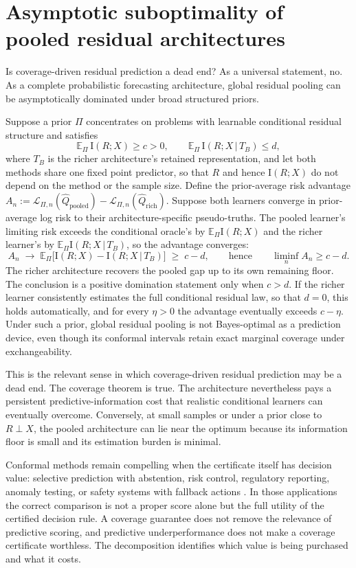 \documentclass[11pt]{article}
\theoremstyle{remark}
\newcommand{\E}{\mathbb{E}}
\newcommand{\I}{\mathrm{I}}
\newcommand{\given}{\,|\,}
\newcommand{\Loss}{\mathcal{L}}
\begin{document}
\section{Asymptotic suboptimality of pooled residual architectures}\label{sec:deadend}

Is coverage-driven residual prediction a dead end? As a universal statement, no. As a complete
probabilistic forecasting architecture, global residual pooling can be asymptotically dominated
under broad structured priors.

Suppose a prior $\Pi$ concentrates on problems with learnable conditional residual structure
and satisfies
\[
\E_\Pi\,\I(R;X)\ge c>0,\qquad \E_\Pi\,\I(R;X\given T_B)\le d,
\]
where $T_B$ is the richer architecture's retained representation, and let both methods share
one fixed point predictor, so that $R$ and hence $\I(R;X)$ do not depend on the method or
the sample size. Define the prior-average risk advantage
$A_n:=\Loss_{\Pi,n}(\widehat Q_{\mathrm{pooled}})-\Loss_{\Pi,n}(\widehat
Q_{\mathrm{rich}})$. Suppose both learners converge in prior-average log risk to their
architecture-specific pseudo-truths. The pooled learner's limiting risk exceeds the
conditional oracle's by $\E_\Pi\I(R;X)$ and the richer learner's by
$\E_\Pi\I(R;X\given T_B)$, so the advantage converges:
\[
A_n\;\longrightarrow\;\E_\Pi\big[\I(R;X)-\I(R;X\given T_B)\big]\;\ge\;c-d,
\qquad\text{hence}\qquad \liminf_n A_n\ge c-d.
\]
The richer architecture recovers the pooled gap up to its own remaining floor. The conclusion
is a positive domination statement only when $c>d$. If the richer learner
consistently estimates the full conditional residual law, so that $d=0$, this holds
automatically, and for every $\eta>0$ the advantage eventually exceeds $c-\eta$. Under such
a prior,
global residual pooling is not Bayes-optimal as a prediction device, even though its conformal
intervals retain exact marginal coverage under exchangeability.

This is the relevant sense in which coverage-driven residual prediction may be a dead end.
The coverage theorem is true. The architecture nevertheless pays a persistent
predictive-information cost that realistic conditional learners can eventually overcome.
Conversely, at small samples or under a prior close to $R\perp X$, the pooled architecture can
lie near the optimum because its information floor is small and its estimation burden is
minimal.

Conformal methods remain compelling when the certificate itself has decision value: selective
prediction with abstention, risk control, regulatory reporting, anomaly testing, or safety
systems with fallback actions
\citep{angelopoulos2021uncertainty,bates2021distribution,angelopoulos2024conformalrisk}. In
those applications the correct comparison is not a proper score alone but the full utility of
the certified decision rule. A coverage guarantee does not remove the relevance of predictive scoring, and predictive
underperformance does not make a coverage certificate worthless.
The decomposition identifies which value is being purchased and what it costs.
\end{document}
